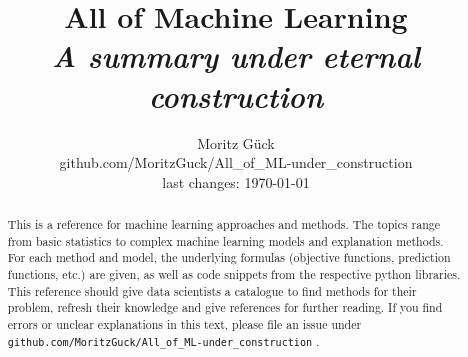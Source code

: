 \documentclass[oneside,a4paper]{paper}
\title{All of Machine Learning \\ \small{\textit{A summary under eternal construction}}}
\author{
	Moritz Gück \\
	github.com/MoritzGuck/All\_of\_ML-under\_construction \\
	last changes: \today   \\
	}
\date{}
\begin{document}
\maketitle

\begin{abstract}
This is a reference for machine learning approaches and methods. The topics range from basic statistics to complex machine learning models and explanation methods. For each method and model, the underlying formulas (objective functions, prediction functions, etc.) are given, as well as code snippets from the respective python libraries. This reference should give data scientists a catalogue to find methods for their problem, refresh their knowledge and give references for further reading. If you find errors or unclear explanations in this text, please file an issue under \\ \verb=github.com/MoritzGuck/All_of_ML-under_construction= . 
\end{abstract}

\tableofcontents

\newpage












\printindex
\end{document}
